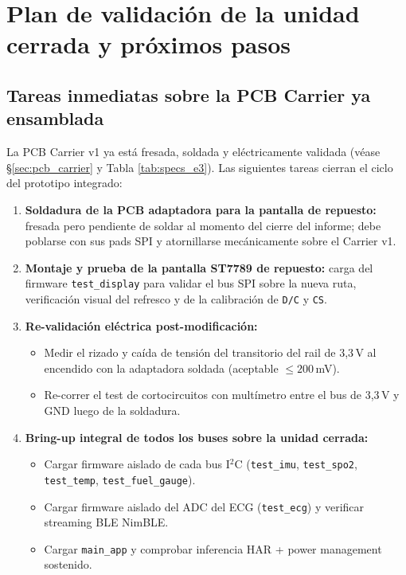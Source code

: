 \documentclass[letterpaper,11pt]{article}
\newcommand{\rtabla}[1]{Tabla \ref{#1}}
\begin{document}
\section{Plan de validación de la unidad cerrada y próximos pasos}\label{sec:plan_validacion}

\subsection{Tareas inmediatas sobre la PCB Carrier ya ensamblada}

La PCB Carrier v1 ya está fresada, soldada y eléctricamente validada (véase §\ref{sec:pcb_carrier} y \rtabla{tab:specs_e3}). Las siguientes tareas cierran el ciclo del prototipo integrado:
\begin{enumerate}
    \item \textbf{Soldadura de la PCB adaptadora para la pantalla de repuesto:} fresada pero pendiente de soldar al momento del cierre del informe; debe poblarse con sus pads SPI y atornillarse mecánicamente sobre el Carrier v1.
    \item \textbf{Montaje y prueba de la pantalla ST7789 de repuesto:} carga del firmware \texttt{test\_display} para validar el bus SPI sobre la nueva ruta, verificación visual del refresco y de la calibración de \texttt{D/C} y \texttt{CS}.
    \item \textbf{Re-validación eléctrica post-modificación:}
    \begin{itemize}
        \item Medir el rizado y caída de tensión del transitorio del rail de 3,3\,V al encendido con la adaptadora soldada (aceptable $\le 200$\,mV).
        \item Re-correr el test de cortocircuitos con multímetro entre el bus de 3,3\,V y GND luego de la soldadura.
    \end{itemize}
    \item \textbf{Bring-up integral de todos los buses sobre la unidad cerrada:}
    \begin{itemize}
        \item Cargar firmware aislado de cada bus I$^2$C (\texttt{test\_imu}, \texttt{test\_spo2}, \texttt{test\_temp}, \texttt{test\_fuel\_gauge}).
        \item Cargar firmware aislado del ADC del ECG (\texttt{test\_ecg}) y verificar streaming BLE NimBLE.
        \item Cargar \texttt{main\_app} y comprobar inferencia HAR + power management sostenido.
    \end{itemize}
\end{enumerate}
\end{document}
